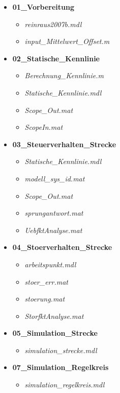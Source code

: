 \documentclass[11pt, a4paper,parskip=half]{article}
\begin{document}
\begin{itemize}
\item \textbf{01\_Vorbereitung}
	\begin{itemize}
	\item \textit{reinraus2007b.mdl}
	\item \textit{input\_Mittelwert\_Offset.m}
	\end{itemize}
	
\item \textbf{02\_Statische\_Kennlinie}
	\begin{itemize}
	\item \textit{Berechnung\_Kennlinie.m}
	\item \textit{Statische\_Kennlinie.mdl}
	\item \textit{Scope\_Out.mat}
	\item \textit{ScopeIn.mat}
	\end{itemize}
	
\item \textbf{03\_Steuerverhalten\_Strecke}
	\begin{itemize}
	\item \textit{Statische\_Kennlinie.mdl}
	\item \textit{modell\_sys\_id.mat}
	\item \textit{Scope\_Out.mat}
	\item \textit{sprungantwort.mat}
	\item \textit{UebfktAnalyse.mat}
	\end{itemize}
	
\item \textbf{04\_Stoerverhalten\_Strecke}
	\begin{itemize}
	\item \textit{arbeitspunkt.mdl}
	\item \textit{stoer\_err.mat}
	\item \textit{stoerung.mat}
	\item \textit{StorfktAnalyse.mat}

	\end{itemize}
	
\item \textbf{05\_Simulation\_Strecke}
	\begin{itemize}
	\item \textit{simulation\_strecke.mdl}
	\end{itemize}
	
\item \textbf{07\_Simulation\_Regelkreis}
	\begin{itemize}
	\item \textit{simulation\_regelkreis.mdl}
	\end{itemize}
	

\end{itemize}
\end{document}
